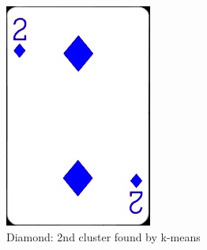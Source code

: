 \documentclass[conference]{IEEEtran}
\begin{document}
\begin{figure}[!htb]
\begin{minipage}[b]{0.2\textwidth}
    \label{Diamond: 1st cluster found by k-means}
  \end{minipage}
  \hfill
  \begin{minipage}[b]{0.2\textwidth}
    \includegraphics[width=\textwidth]{../programme/results/Task_4/diamond/HSV/image_2.jpg}
    \caption{Diamond: 2nd cluster found by k-means}
    \label{Diamond: 2nd cluster found by k-means}
  \end{minipage}
\end{figure}
\end{document}
